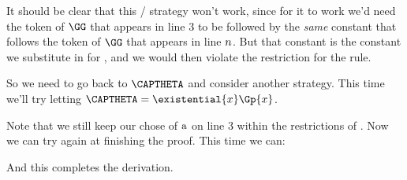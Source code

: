 It should be clear that this / strategy won't work, since for it to work we'd need the token of $\GG$ that appears in line 3 to be followed by the \emph{same} constant that follows the token of $\GG$ that appears in line $n$. 
But that constant is the constant we substitute in for , and we would then violate the restriction for the rule. 

So we need to go back to $\CAPTHETA$ and consider another strategy. 
This time we'll try letting $\CAPTHETA=\existential{\variable{x}}\Gp{\variable{x}}$.
\begin{gproof}[\label{GQDExampleL}]
\end{gproof}
Note that we still keep our chose of $\mathrm{a}$ on line 3 within the restrictions of . 
Now we can try again at finishing the proof. 
This time we can:
\begin{gproof}[\label{GQDExampleM}]
\end{gproof}
And this completes the derivation. 

